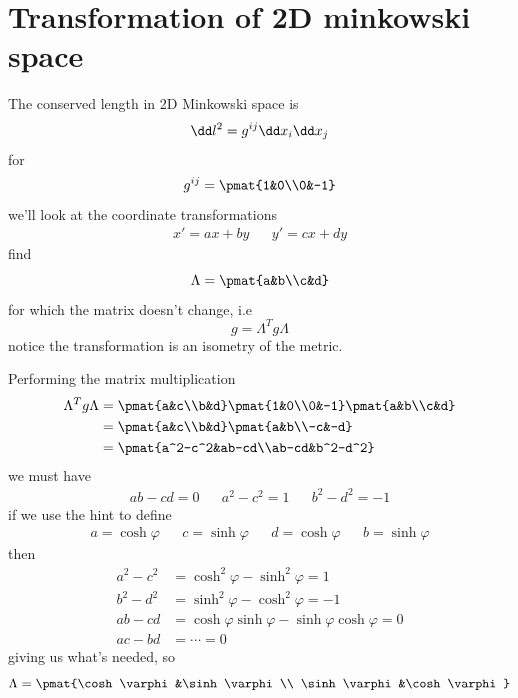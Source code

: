 \clearpage
\section{Transformation of 2D minkowski space}
\begin{colbox}
	The conserved length in 2D Minkowski space is
	\begin{equation}
		\dd l^2 = g\indices{^{ij}}\dd x_i \dd x_j
	\end{equation}
	for
	\begin{equation}
		g\indices{^{ij}} = \pmat{1&0\\0&-1}
	\end{equation}
	we'll look at the coordinate transformations
	\begin{align}
		x' = ax+by && y' = cx+dy
	\end{align}
	find
	\begin{equation}
		\Lambda = \pmat{a&b\\c&d}
	\end{equation}
	for which the matrix doesn't change, i.e 
	\begin{equation}
		g = \Lambda^T g\Lambda
	\end{equation}
	notice the transformation is an isometry of the metric.
\end{colbox}
Performing the matrix multiplication
\begin{align}
	\Lambda^T g\Lambda &= \pmat{a&c\\b&d}\pmat{1&0\\0&-1}\pmat{a&b\\c&d}\\
	&= \pmat{a&c\\b&d}\pmat{a&b\\-c&-d}\\
	&= \pmat{a^2-c^2&ab-cd\\ab-cd&b^2-d^2}
\end{align}
we must have
\begin{align}
	ab-cd = 0 && a^2-c^2 = 1 && b^2-d^2=-1
\end{align}
if we use the hint to define
\begin{align}
	a = \cosh\varphi && c=\sinh\varphi && d=\cosh\varphi && b=\sinh\varphi
\end{align}
then
\begin{align}
	a^2-c^2 &= \cosh^2\varphi-\sinh^2\varphi=1 \\
	b^2-d^2 &= \sinh^2\varphi-\cosh^2\varphi=-1 \\
	ab-cd &= \cosh\varphi\sinh\varphi-\sinh\varphi\cosh\varphi=0 \\
	ac-bd &= \cdots = 0
\end{align}
giving us what's needed, so
\begin{equation}
	\Lambda = \pmat{\cosh\varphi&\sinh\varphi\\ \sinh\varphi&\cosh\varphi}
\end{equation}